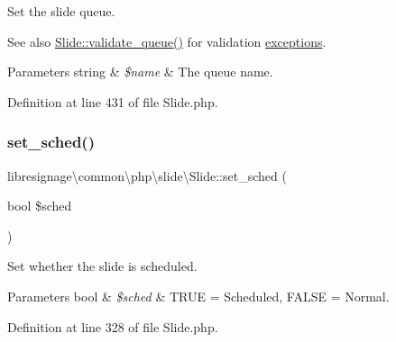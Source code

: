 Set the slide queue.

\begin{DoxySeeAlso}{See also}
\hyperlink{classlibresignage_1_1common_1_1php_1_1slide_1_1Slide_a47e245fb24508ab3a69ba3571c601c33}{Slide\+::validate\+\_\+queue()} for validation \hyperlink{namespacelibresignage_1_1common_1_1php_1_1slide_1_1exceptions}{exceptions}.
\end{DoxySeeAlso}

\begin{DoxyParams}[1]{Parameters}
string & {\em \$name} & The queue name. \\
\hline
\end{DoxyParams}


Definition at line 431 of file Slide.\+php.

\mbox{\label{classlibresignage_1_1common_1_1php_1_1slide_1_1Slide_ad97c51e4324ffbddb791d1a906a2c3fd}} 
\subsubsection{\texorpdfstring{set\+\_\+sched()}{set\_sched()}}
{\footnotesize\ttfamily libresignage\textbackslash{}common\textbackslash{}php\textbackslash{}slide\textbackslash{}\+Slide\+::set\+\_\+sched (\begin{DoxyParamCaption}\item[{bool}]{\$sched }\end{DoxyParamCaption})}

Set whether the slide is scheduled.


\begin{DoxyParams}[1]{Parameters}
bool & {\em \$sched} & T\+R\+UE = Scheduled, F\+A\+L\+SE = Normal. \\
\hline
\end{DoxyParams}


Definition at line 328 of file Slide.\+php.

\mbox{\label{classlibresignage_1_1common_1_1php_1_1slide_1_1Slide_a8437d82f436d281dea67da2ba5862623}} 
